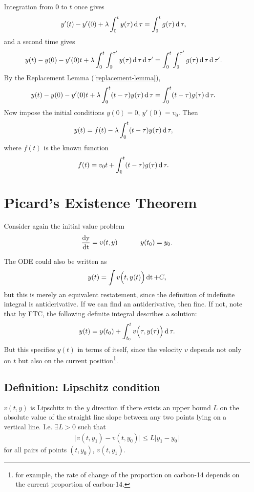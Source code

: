 Integration from $0$ to $t$ once gives
\begin{align*}
  y'(t) - y'(0) + \lambda \int_0^t y(\tau) \operatorname{\text{d}}\tau
  &= \int_0^t g(\tau) \operatorname{\text{d}}\tau,
\end{align*}
and a second time gives
\begin{align*}
  y(t) - y(0) - y'(0)t + \lambda \int_0^t\int_0^{\tau'} y(\tau) \operatorname{\text{d}}\tau \operatorname{\text{d}}\tau'
  &= \int_0^t\int_0^{\tau'} g(\tau) \operatorname{\text{d}}\tau\operatorname{\text{d}}\tau'.
\end{align*}
By the Replacement Lemma (\ref{replacement-lemma}),
\begin{align*}
  y(t) - y(0) - y'(0)t + \lambda \int_0^t (t - \tau) y(\tau) \operatorname{\text{d}}\tau
  &= \int_0^t (t - \tau) g(\tau) \operatorname{\text{d}}\tau.
\end{align*}
Now impose the initial conditions $y(0) = 0$, $y'(0) = v_0$. Then
\begin{align*}
  y(t) &= f(t) - \lambda \int_0^t (t - \tau) y(\tau) \operatorname{\text{d}}\tau,
\end{align*}
where $f(t)$ is the known function
\begin{align*}
  f(t) &= v_0t + \int_0^t (t - \tau) g(\tau) \operatorname{\text{d}}\tau.
\end{align*}


\section{Picard's Existence Theorem}
Consider again the initial value problem
\begin{align*}
  \frac{\operatorname{\text{dy}}}{\operatorname{\text{dt}}} = v(t, y) ~~~~~~~~~~ y(t_0) = y_0.
\end{align*}


The ODE could also be written as
\begin{align*}
  y(t) = \int v\Big(t, y(t)\Big) \operatorname{\text{dt}} + C,
\end{align*}
but this is merely an equivalent restatement, since the definition of
indefinite integral is antiderivative. If we can find an antiderivative, then
fine. If not, note that by FTC, the following definite integral describes a
solution:
\begin{align*}
  y(t) = y(t_0) + \int_{t_0}^t v\Big(\tau, y(\tau)\Big) \operatorname{\text{d}}\tau.
\end{align*}
But this specifies $y(t)$ in terms of itself, since the velocity $v$ depends
not only on $t$ but also on the current position\footnote{for example, the rate
  of change of the proportion on carbon-14 depends on the current proportion of
  carbon-14.}.\\

\subsection{Definition: Lipschitz condition}
$v(t, y)$ is Lipschitz in the $y$ direction if there exists an upper bound $L$
on the absolute value of the straight line slope between any two points lying
on a vertical line. I.e. $\exists L > 0$ such that
\begin{align*}
  \Big|v(t, y_1) - v(t, y_0)\Big| \leq L\Big|y_1 - y_0\Big|
\end{align*}
for all pairs of points $(t, y_0)$, $v(t, y_1)$.

